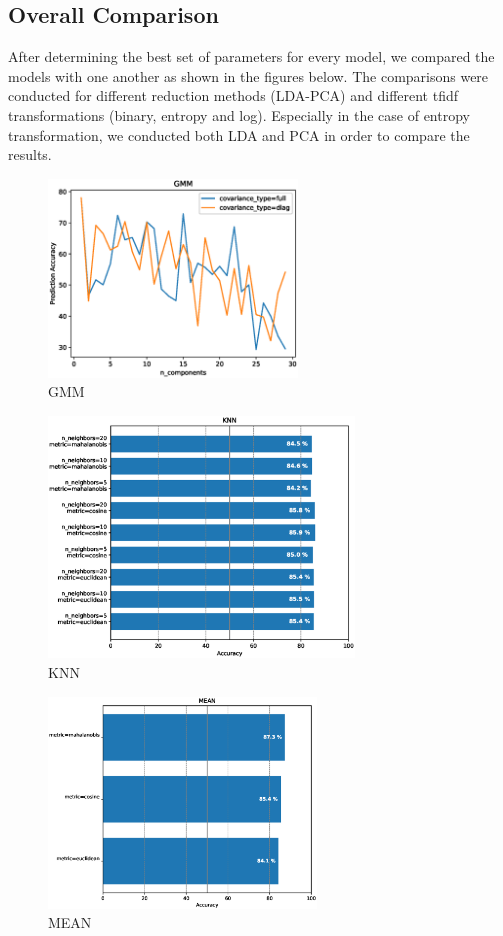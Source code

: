 \documentclass[10pt,journal,compsoc]{IEEEtran}
\begin{document}
\subsection{Overall Comparison}
After determining the best set of parameters
for every model, we compared the models 
with one another as shown in the figures below.
The comparisons were conducted for different reduction
methods (LDA-PCA) and different tfidf transformations
(binary, entropy and log).
Especially in the case of entropy transformation,
we conducted both LDA and PCA in order to compare
the results.
\begin{figure}[!h]
	\centering
	\includegraphics[width=2.6in]{./img/GMM.eps}
	\caption{GMM}
	\label{GMM}
\end{figure}
\begin{figure}[!h]
	\centering
	\includegraphics[width=3.2in]{./img/KNN.eps}
	\caption{KNN}
	\label{KNN}
\end{figure}
\begin{figure}[!h]
	\centering
	\includegraphics[width=2.8in]{./img/MEAN.eps}
	\caption{MEAN}
	\label{MEAN}
\end{figure}
\end{document}
